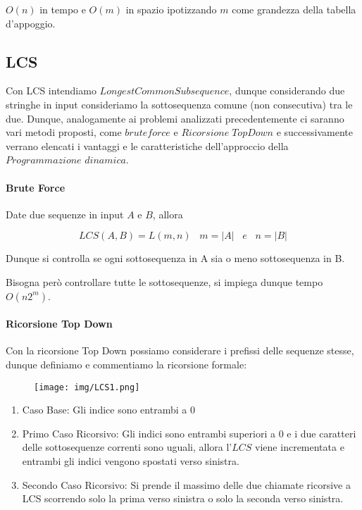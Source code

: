 \documentclass{article}
\begin{document}
$O(n)$ in tempo e $O(m)$ in spazio ipotizzando $m$ come grandezza della tabella d'appoggio.

\newpage

\subsection{LCS} Con LCS intendiamo \(Longest Common Subsequence\), dunque considerando due stringhe in input consideriamo la sottosequenza comune (non consecutiva) tra le due. Dunque, analogamente ai problemi analizzati precedentemente ci saranno vari metodi proposti, come \(brute force\) e $Ricorsione \; Top Down$ e successivamente verrano elencati i vantaggi e le caratteristiche dell'approccio della $Programmazione$ $dinamica$.

\paragraph{Brute Force} Date due sequenze in input $A$ e $B$, allora

\begin{equation}
    LCS(A,B) = L(m,n) \; \; \; m = |A| \; \; \; e \; \; \; n = |B|
\end{equation}

Dunque si controlla se ogni sottosequenza in A sia o meno sottosequenza in B.

Bisogna però controllare tutte le sottosequenze, si impiega dunque tempo $O(n2^{m})$.

\paragraph{Ricorsione Top Down} Con la ricorsione Top Down possiamo considerare i prefissi delle sequenze stesse, dunque definiamo e commentiamo la ricorsione formale:

    \begin{figure}[htbp]
        \center
        \texttt{[image: img/LCS1.png]}
    \end{figure}

\begin{enumerate}
    \item Caso Base: Gli indice sono entrambi a 0
    \item Primo Caso Ricorsivo: Gli indici sono entrambi superiori a 0 e i due caratteri delle sottosequenze correnti sono uguali, allora l'$LCS$ viene incrementata e entrambi gli indici vengono spostati verso sinistra.
    \item Secondo Caso Ricorsivo: Si prende il massimo delle due chiamate ricorsive a LCS scorrendo solo la prima verso sinistra o solo la seconda verso sinistra.
\end{enumerate}
\end{document}
